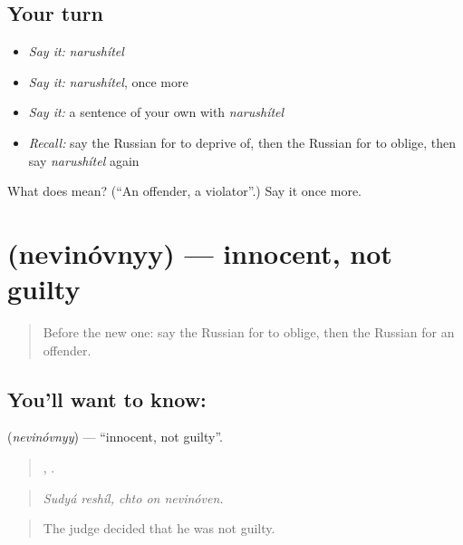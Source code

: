 \subsection*{Your turn}
\begin{itemize}
\raggedright
  \item \emph{Say it:} \emph{narushítel}
  \item \emph{Say it:} \emph{narushítel}, once more
  \item \emph{Say it:} a sentence of your own with \emph{narushítel}
  \item \emph{Recall:} say the Russian for to deprive of, then the Russian for to oblige, then say \emph{narushítel} again
\end{itemize}

\begin{tcolorbox}[breakable,colback=teal!4,colframe=teal!35!black,title={Before you move on}]
What does  mean? (\textquotedblleft{}An offender, a violator\textquotedblright{}.) Say it once more.
\end{tcolorbox}
\section[\texorpdfstring{\ru{невиновный} (nevinóvnyy)}{невиновный (nevinóvnyy)}]{ (nevinóvnyy) — innocent, not guilty}

\label{lesson:RU-C392-nevinovnyy}



\begin{quote}
Before the new one: say the Russian for to oblige, then the Russian for an offender.
\end{quote}

\subsection*{You'll want to know: }
\textbf{} (\emph{nevinóvnyy}) — \textquotedblleft{}innocent, not guilty\textquotedblright{}.

\begin{quote}
 ,   .
\end{quote}

\begin{quote}
\emph{Sudyá reshíl, chto on nevinóven.}
\end{quote}

\begin{quote}
The judge decided that he was not guilty.
\end{quote}

